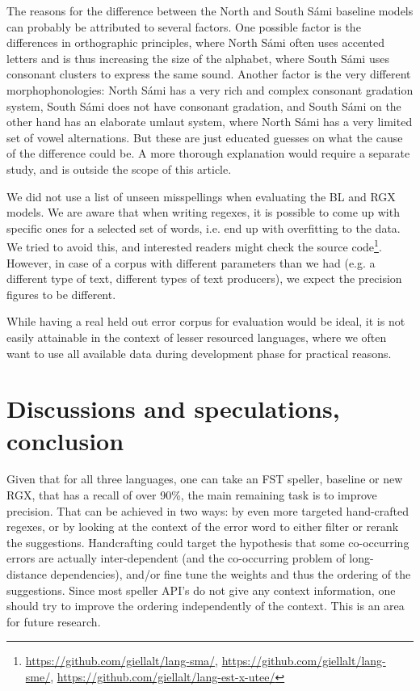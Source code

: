 \documentclass{flammie}
\begin{document}
The reasons for the difference between the North and South Sámi baseline models
can probably be attributed to several factors.  One possible factor is the
differences in orthographic principles, where North Sámi often uses accented
letters and is thus increasing the size of the alphabet, where South Sámi uses
consonant clusters to express the same sound. Another factor is the very
different morphophonologies: North Sámi has a very rich and complex consonant
gradation system, South Sámi does not have consonant gradation, and South Sámi
on the other hand has an elaborate umlaut system, where North Sámi has a very
limited set of vowel alternations. But these are just educated guesses on what
the cause of the difference could be. A more thorough explanation would require
a separate study, and is outside the scope of this article.

We did not use a list of unseen misspellings when evaluating the BL and RGX
models. We are aware that when writing regexes, it is possible to come up with
specific ones for a selected set of words, i.e. end up with overfitting to the
data. We tried to avoid this, and interested readers might check the source
code\footnote{\url{https://github.com/giellalt/lang-sma/},
\url{https://github.com/giellalt/lang-sme/},
\url{https://github.com/giellalt/lang-est-x-utee/}}. However, in case of a
corpus with different parameters than we had (e.g. a different type of text,
different types of text producers), we expect the precision figures to be
different.

While having a real held out error corpus for evaluation would be ideal, it is
not easily attainable in the context of lesser resourced languages, where we
often want to use all available data during development phase for practical
reasons.

\section{Discussions and speculations, conclusion}

Given that for all three languages, one can take an FST speller, baseline or new
RGX, that has a recall of over 90\%, the main remaining task is to improve
precision. That can be achieved in two ways: by even more targeted hand-crafted
regexes, or by looking at the context of the error word to either filter or
rerank the suggestions. Handcrafting could target the hypothesis that some
co-occurring errors are actually inter-dependent (and the co-occurring problem
of long-distance dependencies), and/or fine tune the weights and thus the
ordering of the suggestions.  Since most speller API's do not give any context
information, one should try to improve the ordering independently of the
context. This is an area for future research.
\end{document}
